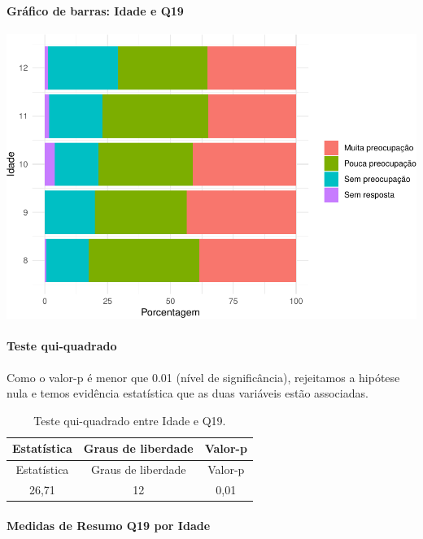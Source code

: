 \documentclass[]{article}
\let\oldparagraph\paragraph
\renewcommand{\paragraph}[1]{\oldparagraph{#1}\mbox{}}
\begin{document}
\hypertarget{gruxe1fico-de-barras-idade-e-q19}{%
\paragraph{Gráfico de barras: Idade e Q19}\label{gruxe1fico-de-barras-idade-e-q19}}

\begin{center}\includegraphics[width=0.75\linewidth]{relatorio_covid19_files/figure-latex/unnamed-chunk-328-1} \end{center}

\hypertarget{teste-qui-quadrado-29}{%
\paragraph{Teste qui-quadrado}\label{teste-qui-quadrado-29}}

Como o valor-p é menor que 0.01 (nível de significância), rejeitamos a hipótese nula e temos evidência estatística que as duas variáveis estão associadas.

\begin{longtable}[]{@{}ccc@{}}
\caption{\label{tab:unnamed-chunk-330}Teste qui-quadrado entre Idade e Q19.}\tabularnewline
\toprule
Estatística & Graus de liberdade & Valor-p\tabularnewline
\midrule
\endfirsthead
\toprule
Estatística & Graus de liberdade & Valor-p\tabularnewline
\midrule
\endhead
26,71 & 12 & 0,01\tabularnewline
\bottomrule
\end{longtable}

\cleardoublepage

\hypertarget{medidas-de-resumo-q19-por-idade}{%
\paragraph{Medidas de Resumo Q19 por Idade}\label{medidas-de-resumo-q19-por-idade}}
\end{document}

